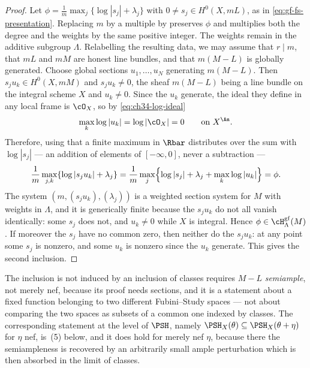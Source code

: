 \begin{proof}
Let $\phi=\frac1m\max_j\{\log|s_j|+\lambda_j\}$ with
$0\ne s_j\in H^0(X,mL)$, as in \eqref{eq:gf-fs-presentation}.  Replacing
$m$ by a multiple by  preserves $\phi$ and
multiplies both the degree and the weights by the same positive integer.
The weights remain in the additive subgroup $\Lambda$.  Relabelling the
resulting data, we may assume that $r\mid m$, that $mL$ and
$mM$ are honest line bundles, and that $m(M-L)$ is globally generated.
Choose global sections $u_1,\dots,u_N$ generating $m(M-L)$.  Then
$s_ju_k\in H^0(X,mM)$ and $s_ju_k\ne0$, the sheaf $m(M-L)$ being a
line bundle on the integral scheme $X$ and $u_k\ne0$.  Since the
$u_k$ generate, the ideal they define in any local frame is
$\cO_X$, so by \eqref{eq:ch34-log-ideal}
\[
 \max_k\log|u_k|=\log|\cO_X|=0
 \qquad\text{on }X^{\An}.
\]
Therefore, using that a finite maximum in $\Rbar$ distributes over the
sum with $\log|s_j|$ --- an addition of elements of $[-\infty,0]$, never
a subtraction ---
\[
 \frac1m\max_{j,k}\{\log|s_ju_k|+\lambda_j\}
 =\frac1m\max_j\Bigl\{\log|s_j|+\lambda_j+\max_k\log|u_k|\Bigr\}
 =\phi .
\]
The system $(m,(s_ju_k),(\lambda_j))$ is a weighted section system for
$M$ with weights in $\Lambda$, and it is generically finite because the
$s_ju_k$ do not all vanish identically: some $s_j$ does not, and
$u_k\ne0$ while $X$ is integral.  Hence
$\phi\in\cH^{\mathrm{gf}}_\Lambda(M)$.  If moreover the $s_j$ have no
common zero, then neither do the $s_ju_k$: at any point some $s_j$ is
nonzero, and some $u_k$ is nonzero since the $u_k$ generate.
This gives the second inclusion.
\end{proof}

\begin{warning}{The inclusion is not induced by an inclusion of classes}
\label{warn:ch39-hgf-monotone}
 requires $M-L$ \emph{semiample}, not merely
nef, because its proof needs sections, and it is a statement about a fixed
function belonging to two different Fubini--Study spaces --- not about
comparing the two spaces as subsets of a common one indexed by classes.
The corresponding statement at the level of $\PSH$, namely
$\PSH_X(\theta)\subseteq\PSH_X(\theta+\eta)$ for $\eta$ nef, is
\,(5) below, and it does hold for merely
nef $\eta$, because there the semiampleness is recovered by an
arbitrarily small ample perturbation which is then absorbed in the limit of
classes.
\end{warning}

